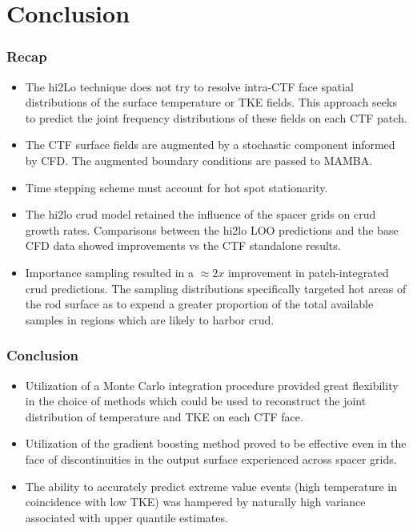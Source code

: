 \documentclass[t, pdftex]{beamer}
\begin{document}
\section{Conclusion}
\begin{frame}
\frametitle{Recap}
\vspace{-16pt}
\begin{itemize}
\item The hi2Lo technique does not try to resolve intra-CTF face spatial distributions
of the surface temperature or TKE fields.  This approach seeks to predict the joint frequency distributions of these fields on each CTF patch.
\item The CTF surface fields are augmented by a stochastic component informed by CFD.  The augmented boundary conditions are passed to MAMBA.
\item Time stepping scheme must account for hot spot stationarity.
\item The hi2lo crud model retained the influence of the spacer grids on crud growth rates.  Comparisons between the hi2lo LOO predictions and the base CFD data showed improvements vs the CTF standalone results.
\item Importance sampling resulted in a $\approx 2x$ improvement in patch-integrated crud predictions.  The sampling distributions specifically targeted hot areas of the rod surface as to expend a greater proportion of the total available samples in regions which are likely to harbor crud.
\end{itemize}
\end{frame}

\begin{frame}
\frametitle{Conclusion}
\vspace{-16pt}
\begin{itemize}
    \item Utilization of a Monte Carlo integration procedure provided great flexibility in the choice of methods which could be used to reconstruct the joint distribution of temperature and TKE on each CTF face.
    \item Utilization of the gradient boosting method proved to be effective even in the face of discontinuities in the output surface experienced across spacer grids.
    
    \item The ability to accurately predict extreme value events (high temperature in coincidence with low TKE) was hampered by naturally high variance associated with upper quantile estimates.
\end{itemize}
\end{frame}
\end{document}
